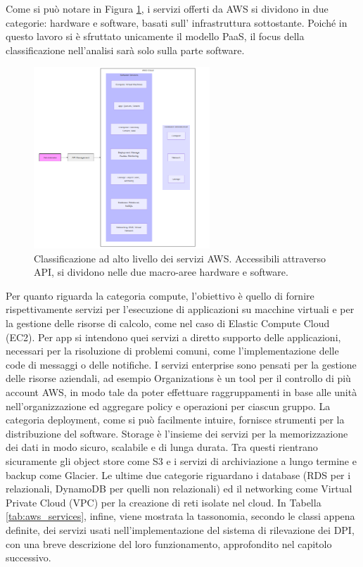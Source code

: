 Come si può notare in Figura \ref{fig:services_taxonomy}, i servizi offerti da AWS si dividono in due categorie: hardware e software, basati sull' infrastruttura sottostante\cite{a10AWSinAction}. Poiché in questo lavoro si è sfruttato unicamente il modello PaaS, %
il focus della classificazione nell'analisi sarà solo sulla parte software.
\begin{figure}[htbp]
    \centering
    \includegraphics[width=0.59\textwidth]{figures/aws_services_taxonomy.png}
    \caption{Classificazione ad alto livello dei servizi AWS. Accessibili attraverso API, si dividono nelle due macro-aree hardware e software.}
    \label{fig:services_taxonomy}
\end{figure}

Per quanto riguarda la categoria compute, l'obiettivo è quello di fornire rispettivamente servizi per l'esecuzione di applicazioni su macchine virtuali e per la gestione delle risorse di calcolo, come nel caso di Elastic Compute Cloud (EC2). Per app si intendono quei servizi a diretto supporto delle applicazioni, necessari per la risoluzione di problemi comuni, come l'implementazione delle code di messaggi o delle notifiche. I servizi enterprise sono pensati per la gestione delle risorse aziendali, ad esempio Organizations è un tool per il controllo di più account AWS, in modo tale da poter effettuare raggruppamenti in base alle unità nell'organizzazione ed aggregare policy e operazioni per ciascun gruppo. La categoria deployment, come si può facilmente intuire, fornisce strumenti per la distribuzione del software. Storage è l'insieme dei servizi per la memorizzazione dei dati in modo sicuro, scalabile e di lunga durata. Tra questi rientrano sicuramente gli object store come S3 e i servizi di archiviazione a lungo termine e backup come Glacier. Le ultime due categorie riguardano i database (RDS per i relazionali, DynamoDB per quelli non relazionali) ed il networking come Virtual Private Cloud (VPC) per la creazione di reti isolate nel cloud. %
In Tabella \ref{tab:aws_services}, infine, viene mostrata la tassonomia, secondo le classi appena definite, dei servizi usati nell'implementazione del sistema di rilevazione dei DPI, con una breve descrizione del loro funzionamento, approfondito nel capitolo successivo. 

